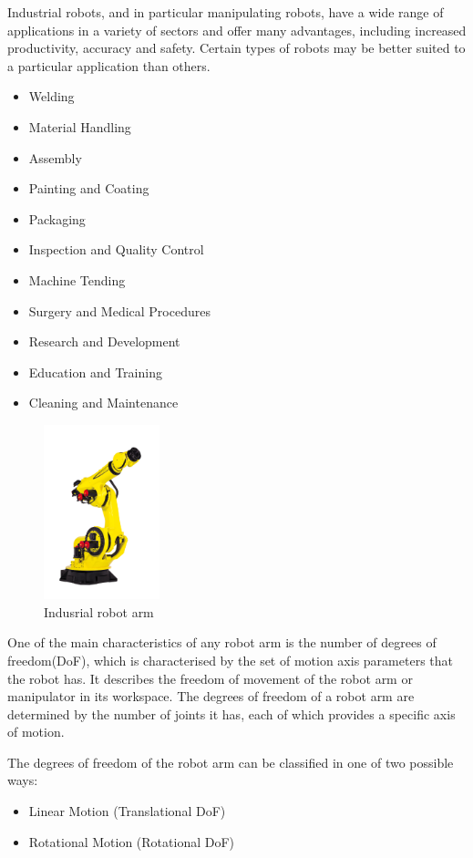 Industrial robots, and in particular manipulating robots, 
have a wide range of applications in a variety of sectors and 
offer many advantages, including increased productivity, accuracy 
and safety. Certain types of robots may be better suited to a particular 
application than others.
\begin{itemize}[itemsep=0pt]
    \item Welding
    \item Material Handling
    \item Assembly
    \item Painting and Coating
    \item Packaging
    \item Inspection and Quality Control
    \item Machine Tending
    \item Surgery and Medical Procedures
    \item Research and Development
    \item Education and Training
    \item Cleaning and Maintenance
\end{itemize}

\begin{figure}[H]
	\centering
	\includegraphics[width=0.3\textwidth]{Src/images/Robot.jpg}
	\caption{Indusrial robot arm}
\end{figure}

One of the main characteristics of any robot arm is the number of degrees of freedom(DoF), which is characterised by the set of motion axis parameters that the robot has.  It describes the freedom of movement of the robot arm or manipulator in its workspace.  The degrees of freedom of a robot arm are determined by the number of joints it has, each of which provides a specific axis of motion.

The degrees of freedom of the robot arm can be classified in one of two possible ways:
\begin{itemize}
    \item Linear Motion (Translational DoF)
    \item Rotational Motion (Rotational DoF)
\end{itemize}

